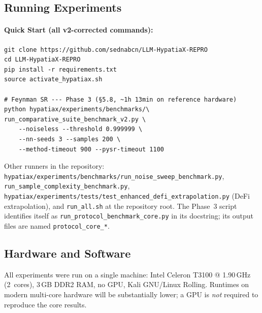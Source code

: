 \documentclass[twoside,11pt]{article}
\begin{document}
\subsection{Running Experiments}

\paragraph{Quick Start (all v2-corrected commands):}
\begin{small}
\begin{verbatim}
git clone https://github.com/sednabcn/LLM-HypatiaX-REPRO
cd LLM-HypatiaX-REPRO
pip install -r requirements.txt
source activate_hypatiax.sh

# Feynman SR --- Phase 3 (§5.8, ~1h 13min on reference hardware)
python hypatiax/experiments/benchmarks/\
run_comparative_suite_benchmark_v2.py \
    --noiseless --threshold 0.999999 \
    --nn-seeds 3 --samples 200 \
    --method-timeout 900 --pysr-timeout 1100
\end{verbatim}
\end{small}

\noindent Other runners in the repository: \texttt{hypatiax/experiments/benchmarks/run\_noise\_sweep\_benchmark.py},
\texttt{run\_sample\_complexity\_benchmark.py}, \texttt{hypatiax/experiments/tests/test\_enhanced\_defi\_extrapolation.py}
(DeFi extrapolation), and \texttt{run\_all.sh} at the repository root. The Phase~3 script identifies itself as
\texttt{run\_protocol\_benchmark\_core.py} in its docstring; its output files are named \texttt{protocol\_core\_*}.


\subsection{Hardware and Software}

All experiments were run on a single machine: Intel Celeron T3100 @
1.90\,GHz (2~cores), 3\,GB DDR2 RAM, no GPU, Kali GNU/Linux Rolling.
Runtimes on modern multi-core hardware will be substantially lower; a GPU
is \emph{not} required to reproduce the core results.
\end{document}
